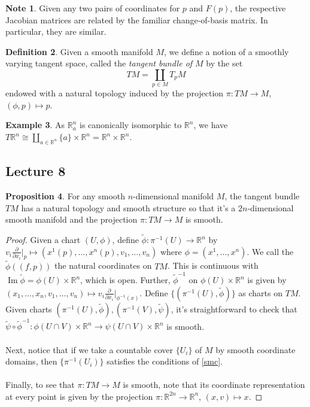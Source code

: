 \documentclass[10pt,letterpaper,cm]{nupset}
\theoremstyle{definition}
\newtheorem{definition}{Definition}[subsection]
\newtheorem{exmp}[definition]{Example}
\newtheorem{note}[definition]{Note}
\theoremstyle{theorem}
\newtheorem{prop}[definition]{Proposition}
\theoremstyle{remark}
\DeclareMathOperator{\Ima}{Im}
\newcommand{\R}{\mathbb R}
\newcommand{\1}{\mathbf{1}}
\newcommand{\0}{\vec 0}
\begin{document}
\begin{note}
Given any two pairs of coordinates for $p$ and $F(p)$, the respective Jacobian matrices are related by the familiar change-of-basis matrix. In particular, they are similar.
\end{note}

\begin{definition}
Given a smooth manifold $M$, we define a notion of a smoothly varying tangent space, called the \textit{tangent bundle of $M$} by the set  $$TM = \coprod_{p \in M} T_pM$$ endowed with a natural topology induced by the projection $\pi: TM \to M$, $(\phi, p) \mapsto p$.
\end{definition}

\begin{exmp}
As $\R_a^n$ is canonically isomorphic to $\R^n$, we have $T\R^n \cong \coprod_{a\in \R^n} \{a\} \times \R^n = \R^n \times \R^n$.
\end{exmp}

\subsection{Lecture 8}

\begin{prop}
For any smooth $n$-dimensional manifold $M$, the tangent bundle $TM$ has a natural topology and smooth structure so that it's a $2n$-dimensional smooth manifold and the projection $\pi : TM \to M$ is smooth.
\end{prop}
\begin{proof}
Given a chart $(U, \phi)$, define $\tilde{\phi}: \pi^{-1}(U) \to \R^n$ by $v_i\frac{\partial}{\partial{x_i}}\rvert_p \mapsto (x^1(p), \ldots, x^n(p), v_1, \ldots, v_n)$ where $\phi = (x^1, \ldots, x^n)$. We call the $\tilde{\phi}((f, p))$ the natural coordinates on $TM$. This is continuous with $\Ima \tilde{\phi} = \phi(U) \times \R^n$, which is open. Further, $\tilde{\phi}^{-1}$ on $\phi(U) \times \R^n$ is given by $(x_1, \ldots, x_n, v_1, \ldots, v_n)\mapsto v_i \frac{\partial}{\partial{x_i}}\rvert_{\phi^{-1}(x)}$. Define $\{(\pi^{-1}(U), \tilde{\phi})\}$ as charts on $TM$. Given charts $(\pi^{-1}(U), \tilde{\phi}), (\pi^{-1}(V), \tilde{\psi})$, it's straightforward to check that $\tilde{\psi} \circ \tilde{\phi}^{-1}: \phi(U \cap V)\times \R^n \to \psi(U \cap V)\times \R^n$ is smooth.
\\ \\
Next, notice that if we take a countable cover $\{U_i\}$ of $M$ by smooth coordinate domains, then $\{\pi^{-1}(U_i)\}$ satisfies the conditions of \cref{smc}.
\\ \\
Finally, to see that $\pi : TM \to M$ is smooth, note that its coordinate representation at every point is given by the projection $\pi:\R^{2n} \to \R^n$, $(x,v) \mapsto x$.
\end{proof}
\end{document}

